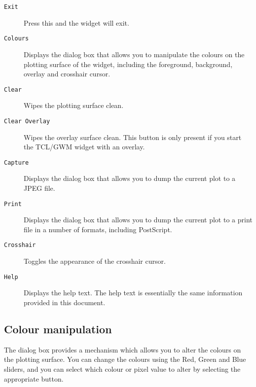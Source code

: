 \documentclass[twoside,11pt,nolof]{starlink}
\begin{document}
\begin{description}

\item[{\texttt{Exit}}] Press this and the widget will exit.

\item[{\texttt{Colours}}] Displays the {} dialog box that
allows you to manipulate the colours on the plotting surface of the
widget, including the foreground, background, overlay and crosshair
cursor.

\item[{\texttt{Clear}}] Wipes the plotting surface clean.

\item[{\texttt{Clear Overlay}}] Wipes the overlay surface clean.  This button is
only present if you start the TCL/GWM widget with an overlay.

\item[{\texttt{Capture}}] Displays the {} dialog box that
allows you to dump the current plot to a JPEG file.

\item[{\texttt{Print}}] Displays the {} dialog box that
allows you to dump the current plot to a print file in a number of
formats, including PostScript.

\item[{\texttt{Crosshair}}] Toggles the appearance of the crosshair cursor.

\item[{\texttt{Help}}] Displays the help text.  The help text is
essentially the same information provided in this document.

\end{description}

\subsection{\label{colour_manipulation}Colour manipulation}

The {} dialog box provides a mechanism which allows you to
alter the colours on the plotting surface.  You can change the colours
using the Red, Green and Blue sliders, and you can select which
colour or pixel value to alter by selecting the appropriate button.
\end{document}
